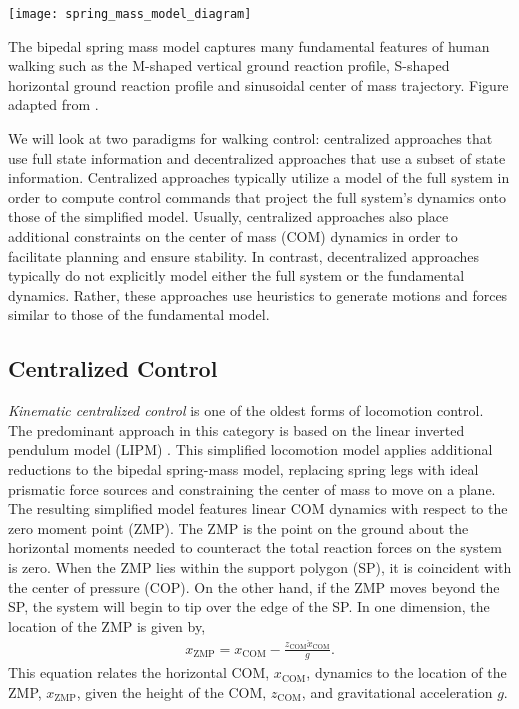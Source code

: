 \begin{marginfigure}
    \centering
    \texttt{[image: spring\_mass\_model\_diagram]}
    \caption{The bipedal spring mass model captures many fundamental features of
    human walking such as the M-shaped vertical ground reaction profile,
    S-shaped horizontal ground reaction profile and sinusoidal center of mass
    trajectory. Figure adapted from \citet{geyer2006compliant}.}
    \label{fig:ssm_diagram}
\end{marginfigure}

We will look at two paradigms for walking control: centralized approaches that
use full state information and decentralized approaches that use a subset of
state information. Centralized approaches typically utilize a model of the full
system in order to compute control commands that project the full system's
dynamics onto those of the simplified model. Usually, centralized approaches
also place additional constraints on the center of mass (COM) dynamics in order
to facilitate planning and ensure stability. In contrast, decentralized
approaches typically do not explicitly model either the full system or the
fundamental dynamics.  Rather, these approaches use heuristics to generate
motions and forces similar to those of the fundamental model.

\subsection{Centralized Control}\label{sec:back_centralized_control}

\emph{Kinematic centralized control} is one of the oldest forms of locomotion
control. The predominant approach in this category is based on the linear
inverted pendulum model (LIPM) \citep{kajita1991study, kajita20013d}.  This
simplified locomotion model applies additional reductions to the bipedal
spring-mass model, replacing spring legs with ideal prismatic force sources and
constraining the center of mass to move on a plane. The resulting simplified
model features linear COM dynamics with respect to the zero moment point (ZMP).
The ZMP is the point on the ground about the horizontal moments needed to
counteract the total reaction forces on the system is zero. When the ZMP lies
within the support polygon (SP), it is coincident with the center of pressure (COP). On the other
hand, if the ZMP moves beyond the SP, the system will begin to tip over the edge
of the SP. In one dimension, the location of the ZMP is given by, 
\begin{align} 
    x_\textrm{ZMP} = x_\textrm{COM} - \frac{z_\textrm{COM}
        \ddot{x}_\textrm{COM}}{g}. 
    \label{eq:ZMP}
\end{align}
This equation relates the horizontal COM, $x_\textrm{COM}$, dynamics to the
location of the ZMP, $x_\textrm{ZMP}$, given the height of the COM,
$z_\textrm{COM}$, and gravitational acceleration $g$.

